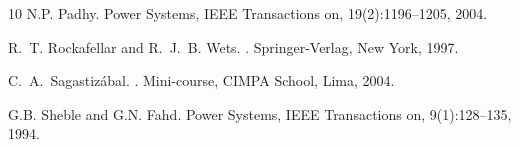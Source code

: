 \documentclass[a4paper,12pt]{report}
\begin{document}
\begin{thebibliography}{10}
N.P. Padhy.
\newblock Power Systems, IEEE Transactions on, 19(2):1196--1205, 2004.

R.~T. Rockafellar and R.~J.~B. Wets.
.
\newblock Springer-Verlag, New York, 1997.

C.~A.~Sagastiz\'abal.
.
\newblock Mini-course, CIMPA School, Lima, 2004.

G.B. Sheble and G.N. Fahd.
\newblock Power Systems, IEEE Transactions on, 9(1):128--135, 1994.

\end{thebibliography}
\end{document}
